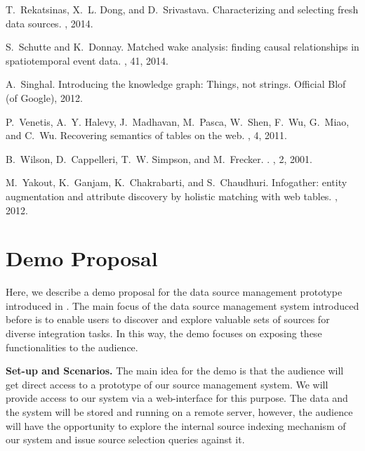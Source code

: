 \documentclass{sig-alternate}
\begin{document}
\begin{thebibliography}{10}
T.~Rekatsinas, X.~L. Dong, and D.~Srivastava.
\newblock Characterizing and selecting fresh data sources.
, 2014.

S.~Schutte and K.~Donnay.
\newblock Matched wake analysis: finding causal relationships in spatiotemporal
  event data.
, 41, 2014.

A.~Singhal.
\newblock Introducing the knowledge graph: Things, not strings.
\newblock Official Blof (of Google), 2012.

P.~Venetis, A.~Y. Halevy, J.~Madhavan, M.~Pasca, W.~Shen, F.~Wu, G.~Miao, and
  C.~Wu.
\newblock Recovering semantics of tables on the web.
, 4, 2011.

B.~Wilson, D.~Cappelleri, T.~W. Simpson, and M.~Frecker.
.
, 2, 2001.

M.~Yakout, K.~Ganjam, K.~Chakrabarti, and S.~Chaudhuri.
\newblock Infogather: entity augmentation and attribute discovery by holistic
  matching with web tables.
, 2012.

\end{thebibliography}

\appendix
\section{Demo Proposal}
Here, we describe a demo proposal for the data source management prototype introduced in . The main focus of the data source management system introduced before is to enable users to discover and explore valuable sets of sources for diverse integration tasks. In this way, the demo focuses on exposing these functionalities to the audience. 

\vspace{3pt}\noindent\textbf{Set-up and Scenarios.} The main idea for the demo is that the audience will get direct access to a prototype of our source management system. We will provide access to our system via a web-interface for this purpose. The data and the system will be stored and running on a remote server, however, the audience will have the opportunity to explore the internal source indexing mechanism of our system and issue source selection queries against it. 
\end{document}

